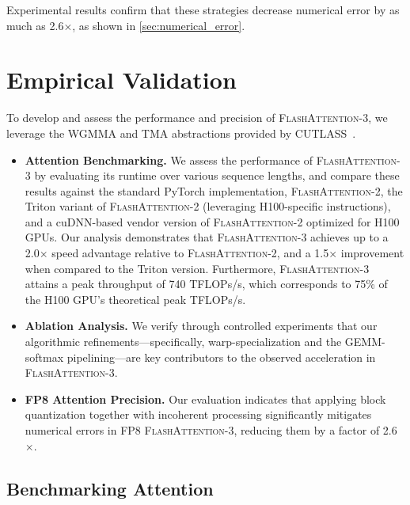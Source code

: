 \begin{enumerate}
\begin{enumerate}
\end{enumerate}

Experimental results confirm that these strategies decrease numerical error by as much as 2.6$\times$, as shown in \cref{sec:numerical_error}.

\section{Empirical Validation}
\label{sec:exp}

To develop and assess the performance and precision of \textsc{FlashAttention-3}, we leverage the WGMMA and TMA abstractions provided by CUTLASS~\citep{Thakkar_CUTLASS_2023}.

\begin{itemize}

\item \textbf{Attention Benchmarking.} We assess the performance of \textsc{FlashAttention-3} by evaluating its runtime over various sequence lengths, and compare these results against the standard PyTorch implementation, \textsc{FlashAttention-2}, the Triton variant of \textsc{FlashAttention-2} (leveraging H100-specific instructions), and a cuDNN-based vendor version of \textsc{FlashAttention-2} optimized for H100 GPUs. Our analysis demonstrates that \textsc{FlashAttention-3} achieves up to a 2.0$\times$ speed advantage relative to \textsc{FlashAttention-2}, and a 1.5$\times$ improvement when compared to the Triton version. Furthermore, \textsc{FlashAttention-3} attains a peak throughput of 740 TFLOPs/s, which corresponds to 75\% of the H100 GPU’s theoretical peak TFLOPs/s.
\item \textbf{Ablation Analysis.} We verify through controlled experiments that our algorithmic refinements—specifically, warp-specialization and the GEMM-softmax pipelining—are key contributors to the observed acceleration in \textsc{FlashAttention-3}.
\item \textbf{FP8 Attention Precision.} Our evaluation indicates that applying block quantization together with incoherent processing significantly mitigates numerical errors in FP8 \textsc{FlashAttention-3}, reducing them by a factor of 2.6$\times$.
\end{itemize}

\subsection{Benchmarking Attention}
\label{subsec:benchmark_attn}


\end{enumerate}
